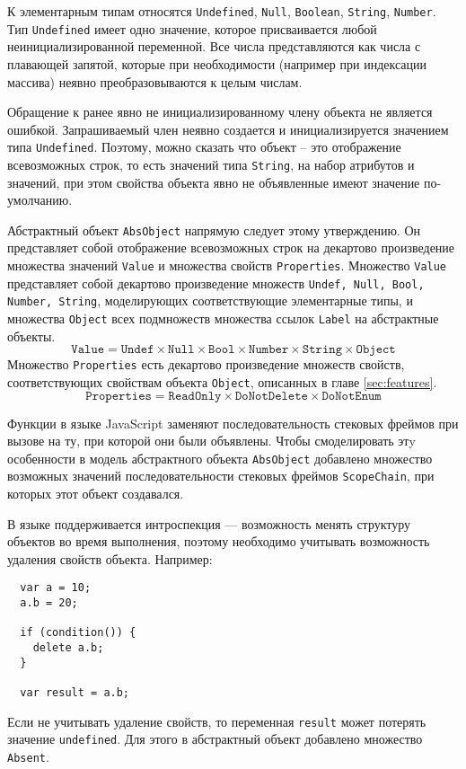 К элементарным типам относятся \texttt{Undefined}, \texttt{Null},
\texttt{Boolean}, \texttt{String}, \texttt{Number}. Тип
\texttt{Undefined} имеет одно значение, которое присваивается любой
неинициализированной переменной. Все числа представляются как числа с
плавающей запятой, которые при необходимости (например при
индексации массива) неявно преобразовываются к целым числам.

Обращение к ранее явно не инициализированному члену объекта не
является ошибкой. Запрашиваемый член неявно создается и
инициализируется значением типа \texttt{Undefined}.  Поэтому, можно
сказать что объект -- это отображение всевозможных строк, то есть
значений типа \texttt{String}, на набор атрибутов и значений, при этом
свойства объекта явно не объявленные имеют значение по-умолчанию.

Абстрактный объект \texttt{AbsObject} напрямую следует
этому утверждению. Он представляет собой отображение всевозможных
строк на декартово произведение множества значений \texttt{Value} и
множества свойств \texttt{Properties}.  Множество \texttt{Value} представляет
собой декартово произведение множеств \texttt{Undef,
Null, Bool, Number, String}, моделирующих соответствующие элементарные
типы, и множества \texttt{Object} всех подмножеств множества ссылок
\texttt{Label} на абстрактные объекты.
\[
\mathtt{
  Value = Undef \times Null \times Bool \times Number \times String
  \times Object
}
\]%
Множество \texttt{Properties} есть декартово произведение множеств
свойств, соответствующих свойствам объекта \texttt{Object}, описанных
в главе \ref{sec:features}.
\[
\mathtt{
  Properties = ReadOnly \times DoNotDelete \times DoNotEnum
}
\]%

Функции в языке JavaScript заменяют последовательность
стековых фреймов при вызове на ту, при которой они были объявлены.
Чтобы смоделировать этy особенности в модель абстрактного объекта
\texttt{AbsObject} добавлено множество возможных значений
последовательности стековых фреймов \texttt{ScopeChain}, при
которых этот объект создавался.

В языке поддерживается интроспекция --- возможность менять структуру
объектов во время выполнения, поэтому необходимо учитывать
возможность удаления свойств объекта. Например:
\begin{lstlisting}
  var a = 10;
  a.b = 20;

  if (condition()) {
    delete a.b;
  }

  var result = a.b;
\end{lstlisting}%
Если не учитывать удаление свойств, то переменная \texttt{result}
может потерять значение \texttt{undefined}. Для этого в абстрактный
объект добавлено множество \texttt{Absent}.

